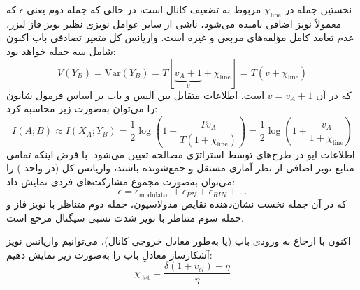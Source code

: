 نخستین جمله در $\chi_{\text{line}}$ مربوط به تضعیف کانال است، در حالی که جمله دوم یعنی $\epsilon$ که معمولاً نویز اضافی نامیده می‌شود، ناشی از سایر عوامل نویزی نظیر نویز فاز لیزر، عدم تعامد کامل مؤلفه‌های مربعی و غیره است. واریانس کل متغیر تصادفی باب اکنون شامل سه جمله خواهد بود:
\begin{equation}
	V(Y_B) = \text{Var}(Y_B) = T \left[ \underbrace{v_A + 1}_{v} + \chi_{\text{line}} \right] = T(v + \chi_{\text{line}})
	\label{eq:6-86}
\end{equation}
که در آن $v = v_A + 1$ است. اطلاعات متقابل بین آلیس و باب بر اساس فرمول شانون را می‌توان به‌صورت زیر محاسبه کرد:
\begin{equation}
	I(A; B) \approx I(X_A; Y_B) = \frac{1}{2} \log \left( 1 + \frac{T v_A}{T(1 + \chi_{\text{line}})} \right) = \frac{1}{2} \log \left( 1 + \frac{v_A}{1 + \chi_{\text{line}}} \right)
	\label{eq:6-87}
\end{equation}
اطلاعات ایو در طرح‌های  توسط استراتژی مصالحه تعیین می‌شود. با فرض اینکه تمامی منابع نویز اضافی از نظر آماری مستقل و جمع‌شونده باشند، واریانس کل (در واحد ) را می‌توان به‌صورت مجموع مشارکت‌های فردی نمایش داد:
\begin{equation}
	\epsilon = \epsilon_{\text{modulator}} + \epsilon_{PN} + \epsilon_{RIN} + \dots
	\label{eq:6-88}
\end{equation}
که در آن جمله نخست نشان‌دهنده نقایص مدولاسیون، جمله دوم متناظر با نویز فاز و جمله سوم متناظر با نویز شدت نسبی سیگنال مرجع  است.

اکنون با ارجاع به ورودی باب (یا به‌طور معادل خروجی کانال)، می‌توانیم واریانس نویز آشکارساز معادلِ باب را به‌صورت زیر نمایش دهیم:
\begin{equation}
	\chi_{\text{det}} = \frac{\delta(1 + v_{el}) - \eta}{\eta}
	\label{eq:6-89}
\end{equation}


